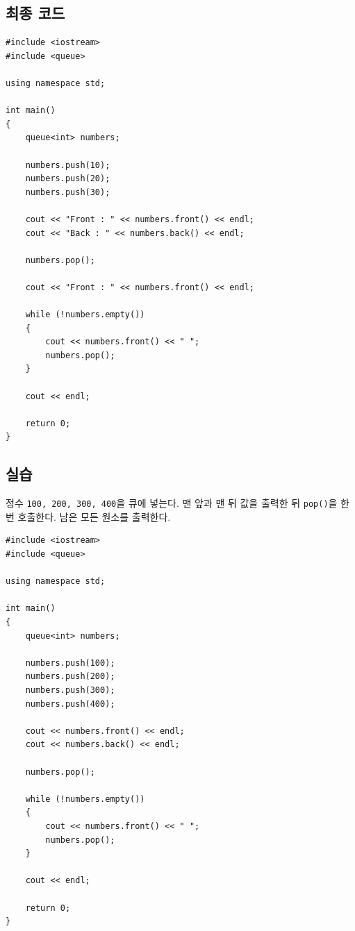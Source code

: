 \documentclass[11pt,a4paper]{article}
\begin{document}
\subsection{최종 코드}
\begin{lstlisting}
#include <iostream>
#include <queue>

using namespace std;

int main()
{
    queue<int> numbers;

    numbers.push(10);
    numbers.push(20);
    numbers.push(30);

    cout << "Front : " << numbers.front() << endl;
    cout << "Back : " << numbers.back() << endl;

    numbers.pop();

    cout << "Front : " << numbers.front() << endl;

    while (!numbers.empty())
    {
        cout << numbers.front() << " ";
        numbers.pop();
    }

    cout << endl;

    return 0;
}
\end{lstlisting}

\subsection{실습}
\begin{practicebox}
정수 \texttt{100, 200, 300, 400}을 큐에 넣는다. 맨 앞과 맨 뒤 값을 출력한 뒤 \texttt{pop()}을 한 번 호출한다. 남은 모든 원소를 출력한다.
\end{practicebox}

\begin{lstlisting}
#include <iostream>
#include <queue>

using namespace std;

int main()
{
    queue<int> numbers;

    numbers.push(100);
    numbers.push(200);
    numbers.push(300);
    numbers.push(400);

    cout << numbers.front() << endl;
    cout << numbers.back() << endl;

    numbers.pop();

    while (!numbers.empty())
    {
        cout << numbers.front() << " ";
        numbers.pop();
    }

    cout << endl;

    return 0;
}
\end{lstlisting}
\end{document}
